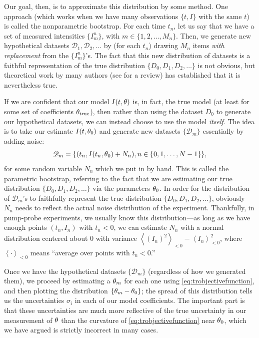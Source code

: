 Our goal, then, is to approximate this distribution by some method.
One approach (which works when we have many observations $\{t, I\}$ with the same $t$) is called the nonparametric bootstrap\citep{cressie}.
For each time $t_n$, let us say that we have a set of measured intensities $\{I^n_m\}$, with $m\in \{1, 2, \ldots, M_n\}$.
Then, we generate new hypothetical datasets $\mathscr{D}_1, \mathscr{D}_2, \ldots$ by (for each $t_n$) drawing $M_n$ items \emph{with replacement} from the $\{I^n_m\}$'s.
The fact that this new distribution of datasets is a faithful representation of the true distribution $\{D_0, D_1, D_2, \ldots\}$ is not obvious, but theoretical work by many authors (see \citet{wackernagel} for a review) has established that it is nevertheless true.

If we are confident that our model $I(t, \theta)$ is, in fact, the true model (at least for some set of coefficients $\theta_\mathrm{true}$), then rather than using the dataset $D_0$ to generate our hypothetical datasets, we can instead choose to use the model \emph{itself}.
The idea is to take our estimate $I(t, \theta_0)$ and generate new datasets $\{\mathscr{D}_m\}$ essentially by adding noise:
\begin{equation}\label{eq:parametricbootstrap}
\mathscr{D}_m = \{(t_n, I(t_n, \theta_0)+N_n), n\in \{0, 1, \ldots, N-1\}\},
\end{equation}
for some random variable $N_n$ which we put in by hand.
This is called the parametric bootstrap, referring to the fact that we are estimating our true distribution $\{D_0, D_1, D_2, \ldots\}$ via the parameters $\theta_0$\citep{dekking}.
In order for the distribution of $\mathscr{D}_m$'s to faithfully represent the true distribution $\{D_0, D_1, D_2, \ldots\}$, obviously $N_n$ needs to reflect the actual noise distribution of the experiment.
Thankfully, in pump-probe experiments, we usually know this distribution---as long as we have enough points $(t_n, I_n)$ with $t_n<0$, we can estimate $N_n$ with a normal distribution centered about $0$ with variance $\left<(I_n)^2\right>_{<0} - \left<I_n\right>_{<0}^2$, where $\left<\cdot\right>_{<0}$ means ``average over points with $t_n<0$.''

Once we have the hypothetical datasets $\{\mathscr{D}_m\}$ (regardless of how we generated them), we proceed by estimating a $\theta_m$ for each one using \cref{eq:trobjectivefunction}, and then plotting the distribution $\{\theta_m - \theta_0\}$; the spread of this distribution tells us the uncertainties $\sigma_i$ in each of our model coefficients.
The important part is that these uncertainties are much more reflective of the true uncertainty in our measurement of $\theta$ than the curvature of \cref{eq:trobjectivefunction} near $\theta_0$, which we have argued is strictly incorrect in many cases.
